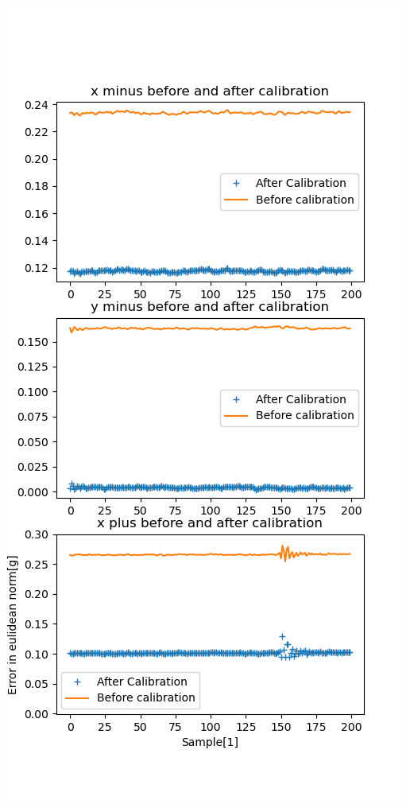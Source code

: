 \documentclass[11pt]{article}
\begin{document}
\begin{center}
\includegraphics[width=.9\linewidth]{./error_fixed_unfixed.png}
\end{center}
\end{document}
